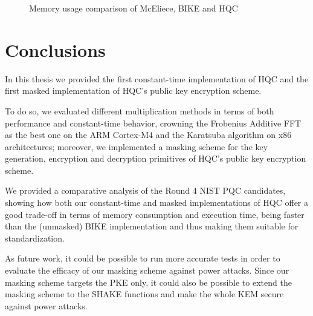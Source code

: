 \documentclass[11pt,a4paper,twocolumn]{article}
\theoremstyle{definition}
\begin{document}
\begin{figure}
        \caption{Memory usage comparison of McEliece, BIKE and HQC}
        \label{fig:memory}
    \end{figure}

\section{Conclusions}
In this thesis we provided the first constant-time implementation of HQC and the
first masked implementation of HQC's public key encryption scheme.

To do so, we evaluated different multiplication methods in terms of both performance and constant-time behavior, 
crowning the Frobenius Additive FFT as the best one on the ARM Cortex-M4 and the Karatsuba algorithm on x86 architectures;
moreover, we implemented a masking scheme for the key generation, encryption and decryption primitives
of HQC's public key encryption scheme.

We provided a comparative analysis of the Round 4 NIST PQC candidates, showing how both our constant-time and masked implementations 
of HQC offer a good trade-off in terms of memory consumption and execution time, being faster than the (unmasked) BIKE implementation
and thus making them suitable for standardization.

As future work, it could be possible to run more accurate tests in order to evaluate the efficacy of our masking scheme against power attacks.
Since our masking scheme targets the PKE only, it could also be possible to extend the masking scheme to 
the SHAKE functions and make the whole KEM secure against power attacks.

\end{document}
